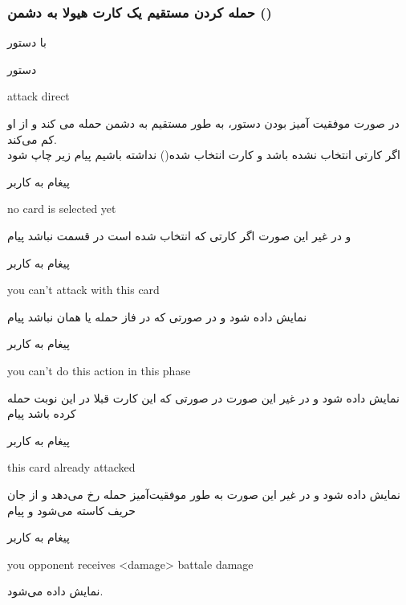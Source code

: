 \documentclass[]{article}
\begin{document}
\subsubsection*{{\titr حمله کردن مستقیم یک کارت هیولا به دشمن ()}}
با دستور
\begin{mybox}[colback=yellow]{دستور}
	\begin{latin}	
		attack direct
	\end{latin}
\end{mybox}
    در صورت موفقیت آمیز بودن دستور، به طور مستقیم به دشمن حمله می کند و از 
     او کم می‌کند.
\\
اگر کارتی انتخاب نشده باشد و کارت انتخاب شده() نداشته باشیم 
پیام زیر چاپ شود
\begin{mybox}[colback=yellow]{پیغام به کاربر}
	\begin{latin}	
		no card is selected yet
	\end{latin}
\end{mybox}
و در غیر این صورت اگر کارتی که انتخاب شده است در قسمت 
نباشد پیام
\begin{mybox}[colback=yellow]{پیغام به کاربر}
	\begin{latin}	
		you can’t attack with this card
	\end{latin}
\end{mybox}
نمایش داده شود و در صورتی که در فاز حمله یا همان  نباشد 
پیام
\begin{mybox}[colback=yellow]{پیغام به کاربر}
	\begin{latin}	
		you can’t do this action in this phase
	\end{latin}
\end{mybox}
نمایش داده شود و در غیر این صورت در صورتی که این کارت قبلا در این نوبت حمله 
کرده باشد پیام
\begin{mybox}[colback=yellow]{پیغام به کاربر}
	\begin{latin}	
		this card already attacked	
	\end{latin}
\end{mybox}
نمایش داده شود و در غیر این صورت به طور موفقیت‌آمیز حمله رخ می‌دهد و از جان 
حریف کاسته می‌شود و پیام
\begin{mybox}[colback=yellow]{پیغام به کاربر}
	\begin{latin}	
		you opponent receives <damage> battale damage	
	\end{latin}
\end{mybox}
نمایش داده می‌شود.
\end{document}
